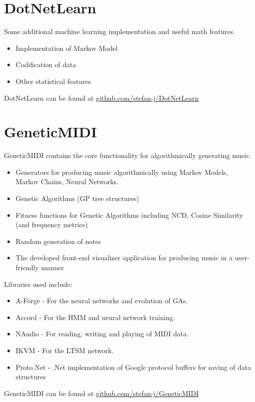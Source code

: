 \section{DotNetLearn}
Some additional machine learning implementation and useful math features.
\begin{itemize}
\item Implementation of Markov Model
\item Codification of data
\item Other statistical features
\end{itemize}
DotNetLearn can be found at \href{https://github.com/stefan-j/DotNetLearn}{github.com/stefan-j/DotNetLearn}

\section{GeneticMIDI}
GeneticMIDI contains the core functionality for algorithmically generating music.
\begin{itemize}
\item Generators for producing music algorithmically using Markov Models, Markov Chains, Neural Networks.
\item Genetic Algorithms (\ac{GP} tree structures)
\item Fitness functions for Genetic Algorithms including \ac{NCD}, Cosine Similarity (and frequency metrics)
\item Random generation of notes
\item The developed front-end visualizer application for producing music in a user-friendly manner
\end{itemize}

Libraries used include:
\begin{itemize}
\item A-Forge - For the neural networks and evolution of \acp{GA}.
\item Accord - For the \ac{HMM} and neural network training.
\item NAudio - For reading, writing and playing of \ac{MIDI} data. 
\item IKVM - For the \ac{LTSM} network.
\item Proto.Net - .Net implementation of Google protocol buffers for saving of data structures
\end{itemize}

GeneticMIDI can be found at \href{https://github.com/stefan-j/GeneticMIDI}{github.com/stefan-j/GeneticMIDI}

